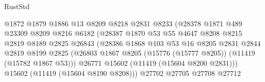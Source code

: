 \begin{lexlean}{RustStd}
\begin{coremodule}
                                        @1872
                                        @1879
                                        @1886
                                        @13
                                        @8209
                                        @8218
                                        @2831
                                        @8233
                                        (@28378
                                          @1871
                                          @489
                                          @23309
                                          @8209
                                          @8216
                                          @6182
                                          (@28387
                                            @1870
                                            @53
                                            @55
                                            @4647
                                            @8208
                                            @8215
                                            @2819
                                            @8189
                                            @2825
                                            @26843
                                            (@28386
                                              @1868
                                              @103
                                              @53
                                              @16
                                              @8205
                                              @2831
                                              @2844
                                              @2819
                                              @8199
                                              @2825
                                              (@26803
                                                @1867
                                                @8205
                                                (@15776 (@15777 @8205))
                                                (@11419 (@15782 @1867 @53)))
                                              @26771
                                              @15602
                                              (@11419 (@15604 @8200 @2831)))
                                            @15602
                                            (@11419 (@15604 @8190 @8208)))
                                          @27702
                                          @27705
                                          @27708
                                          @27712

\end{coremodule}
\end{lexlean}
